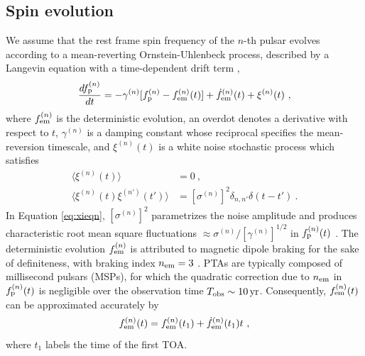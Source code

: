 \documentclass[fleqn,usenatbib,useAMS]{mnras}
\begin{document}
\subsection{Spin evolution} \label{sec:psr_frequency}
We assume that the rest frame spin frequency of the $n$-th pulsar evolves according to a mean-reverting Ornstein-Uhlenbeck process, described by a Langevin equation with a time-dependent drift term \citep{Vargas},
\begin{equation}
	\frac{df_{\rm p}^{(n)}}{dt} = -\gamma^{(n)}	 [f_{\rm p}^{(n)} - f_{\rm em}^{(n)} (t)] + \dot{f}_{\rm em}^{(n)}(t) +\xi^{(n)}(t) \ , 
	\label{eq:frequency_evolution}
\end{equation}
where $f_{\rm em}^{(n)}$ is the deterministic evolution, an overdot denotes a derivative with respect to $t$, $\gamma^{(n)}$ is a damping constant whose reciprocal specifies the mean-reversion timescale, and $\xi^{(n)}(t)$ is a white noise stochastic process which satisfies
\begin{align}
	\langle \xi^{(n)}(t) \rangle &= 0 \ , \\
	\langle \xi^{(n)}(t) \xi^{(n')}(t') \rangle &= [\sigma^{(n)}]^2 \delta_{n,n'} \delta(t - t') \ .	\label{eq:xieqn}
\end{align}
In Equation \eqref{eq:xieqn}, $[\sigma^{(n)}]^2$ parametrizes the noise amplitude and produces characteristic root mean square fluctuations $\approx \sigma^{(n)} / [\gamma^{(n)}]^{1/2}$ in $f_{\rm p}^{(n)}(t)$ \citep{gardiner2009stochastic}. The deterministic evolution $f_{\rm em}^{(n)}$ is attributed to magnetic dipole braking for the sake of definiteness, with braking index $n_{\rm em}=3$ \citep{1969ApJ...157..869G}. PTAs are typically composed of millisecond pulsars (MSPs), for which the quadratic correction due to $n_{\rm em}$ in $f_{\rm p}^{(n)}(t)$ is negligible over the observation time $T_{\rm obs} \sim 10 \, {\rm yr}$. Consequently, 	$f_{\rm em}^{(n)}(t)$ can be approximated accurately by 
\begin{equation}
	f_{\rm em}^{(n)}(t) = f_{\rm em}^{(n)}(t_1) + \dot{f}_{\rm em}^{(n)}(t_1)t \ , \label{eq:spinevol}
\end{equation} 
where $t_1$ labels the time of the first TOA. \newline 
\end{document}

